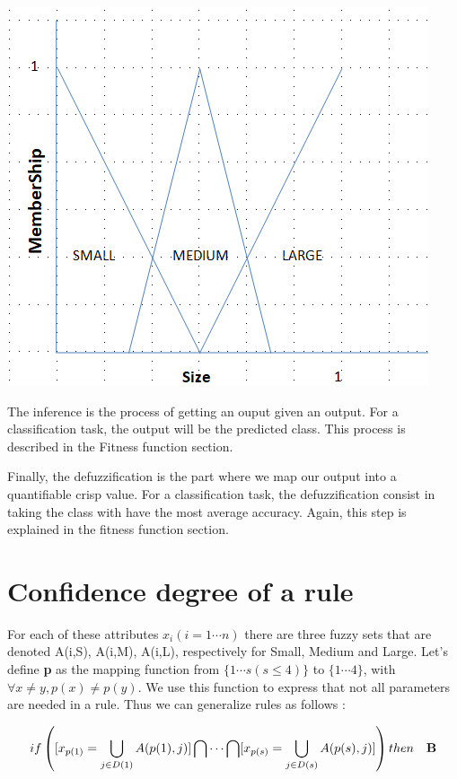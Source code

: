 \documentclass[a4paper,12pt]{article}
\begin{document}
\begin{center}
\includegraphics[scale=0.5]{fuzzymembership}
\end{center}

The inference is the process of getting an ouput given an output. For a classification task, the output will be the predicted class.
This process is described in the Fitness function section.

Finally, the defuzzification is the part where we map our output into a quantifiable crisp value. For a classification task, the defuzzification consist in taking the class with have the most average accuracy. Again, this step is explained in the fitness function section.

\section{Confidence degree of a rule}
For each of these attributes $x_{i}(i=1\cdots n)$ there are three fuzzy sets that are denoted A(i,S), A(i,M), A(i,L), respectively for Small, Medium and Large.
Let's define \textbf{p} as the mapping function from $\{1\cdots s(s\leq4)\}$ to $\{1\cdots4\}$, with $\forall x\neq y, p(x)\neq p(y)$. We use this function to express that not all parameters are needed in a rule.
Thus we can generalize rules as follows :

\[if \left( [x_{p(1)}=\bigcup_{j\in D(1)}A(p(1),j) ] \bigcap\cdots\bigcap[x_{p(s)}=\bigcup_{j\in D(s)}A(p(s),j) ] \right) then\quad \bf B \] 
\end{document}
